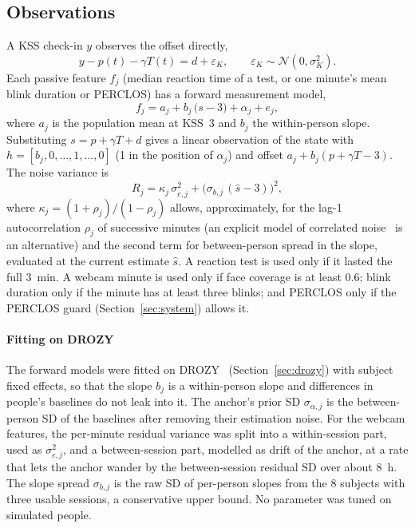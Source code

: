 \subsection{Observations}
A KSS check-in $y$ observes the offset directly,
\begin{equation}
  y - p(t) - \gamma T(t) = d + \varepsilon_K, \qquad \varepsilon_K \sim \mathcal{N}(0, \sigma_K^2).
\end{equation}
Each passive feature $f_j$ (median reaction time of a test, or one minute's mean blink duration or PERCLOS) has a forward measurement model,
\begin{equation}
  f_j = a_j + b_j\,\big(s - 3\big) + \alpha_j + e_j,
  \label{eq:forward}
\end{equation}
where $a_j$ is the population mean at KSS~3 and $b_j$ the within-person slope. Substituting $s = p + \gamma T + d$ gives a linear observation of the state with $h = [b_j, 0, \ldots, 1, \ldots, 0]$ (1 in the position of $\alpha_j$) and offset $a_j + b_j(p + \gamma T - 3)$. The noise variance is
\begin{equation}
  R_j = \kappa_j\,\sigma_{e,j}^2 + \big(\sigma_{b,j}\,(\hat s - 3)\big)^2,
\end{equation}
where $\kappa_j = (1+\rho_j)/(1-\rho_j)$ allows, approximately, for the lag-1 autocorrelation $\rho_j$ of successive minutes (an explicit model of correlated noise~\cite{bryson1968estimation} is an alternative) and the second term for between-person spread in the slope, evaluated at the current estimate $\hat s$. A reaction test is used only if it lasted the full 3~min. A webcam minute is used only if face coverage is at least 0.6; blink duration only if the minute has at least three blinks; and PERCLOS only if the PERCLOS guard (Section~\ref{sec:system}) allows it.

\paragraph*{Fitting on DROZY} The forward models were fitted on DROZY~\cite{massoz2016ulg} (Section~\ref{sec:drozy}) with subject fixed effects, so that the slope $b_j$ is a within-person slope and differences in people's baselines do not leak into it. The anchor's prior SD $\sigma_{\alpha,j}$ is the between-person SD of the baselines after removing their estimation noise. For the webcam features, the per-minute residual variance was split into a within-session part, used as $\sigma_{e,j}^2$, and a between-session part, modelled as drift of the anchor, at a rate that lets the anchor wander by the between-session residual SD over about 8~h. The slope spread $\sigma_{b,j}$ is the raw SD of per-person slopes from the 8 subjects with three usable sessions, a conservative upper bound. No parameter was tuned on simulated people.

